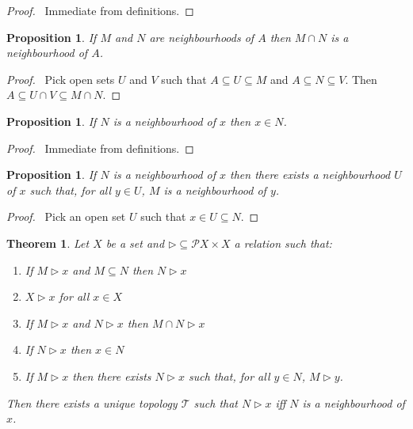 \documentclass{report}
\let\qed\relax
\newtheorem{prop}[lm]{Proposition}
\newtheorem{thm}[lm]{Theorem}
\theoremstyle{definition}
\begin{document}
  \begin{proof}
    \pf\ Immediate from definitions. \qed
  \end{proof}

  \begin{prop}
    \label{prop:topology:neighbourhood:intersection}
    If $M$ and $N$ are neighbourhoods of $A$ then $M \cap N$ is a neighbourhood
    of $A$.
  \end{prop}

  \begin{proof}
    \pf\ Pick open sets $U$ and $V$ such that $A \subseteq U \subseteq M$
    and $A \subseteq N \subseteq V$. Then $A \subseteq U \cap V \subseteq M
    \cap N$.
  \end{proof}

  \begin{prop}
    If $N$ is a neighbourhood of $x$ then $x \in N$.
  \end{prop}

  \begin{proof}
    \pf\ Immediate from definitions. \qed
  \end{proof}

  \begin{prop}
    If $N$ is a neighbourhood of $x$ then there exists a neighbourhood $U$ of
    $x$ such that, for all $y \in U$, $M$ is a neighbourhood of $y$.
  \end{prop}

  \begin{proof}
    \pf\ Pick an open set $U$ such that $x \in U \subseteq N$. \qed
  \end{proof}

  \begin{thm}
    Let $X$ be a set and $\rhd \subseteq \mathcal{P} X \times X$ a relation
    such that:
    \begin{enumerate}
      \item If $M \rhd x$ and $M \subseteq N$ then $N \rhd x$
      \item $X \rhd x$ for all $x \in X$
      \item If $M \rhd x$ and $N \rhd x$ then $M \cap N \rhd x$
      \item If $N \rhd x$ then $x \in N$
      \item If $M \rhd x$ then there exists $N \rhd x$ such that, for all $y
      \in N$, $M \rhd y$.
    \end{enumerate}
    Then there exists a unique topology $\mathcal{T}$ such that $N \rhd x$ iff
    $N$ is a neighbourhood of $x$.
  \end{thm}
\end{document}
